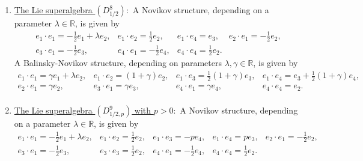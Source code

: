 \documentclass[12pt]{amsart}
\begin{document}
\begin{enumerate}
 \[
 \begin{array}{llll}
e_1\cdot e_1=-p e_1 +\lambda e_2, &  e_1\cdot e_2=(1-p) e_2, &  e_1\cdot e_4= (1-2p) e_4, & e_2\cdot e_1=- p e_2, \\[2mm] 
e_3\cdot e_1=-p e_3,& e_3 \cdot e_4=e_2, & e_4\cdot e_1=-p e_4.
\end{array}
 \]
A Balinsky-Novikov structure, depending on parameters $\lambda, \gamma \in \mathbb R$, is given by
 \[
 \begin{array}{llll}
e_1 \cdot e_1= (\gamma-1) e_1+\lambda e_2, & e_1\cdot e_2= \gamma e_2, & e_1\cdot e_3=\frac{1}{2}(2p+\gamma-1 )e_3, & e_1\cdot e_4= \frac{1}{2}(1-2p+\gamma)e_4,\\[2mm]
e_3\cdot e_1=(\gamma -1) e_3, & e_3\cdot e_4= e_2, & e_2\cdot e_1=(\gamma-1)e_2, &  e_4\cdot e_1=(\gamma-1) e_4\\[2mm]
 e_4\cdot e_3=e_2.
 \end{array}
 \]
   \item \underline{The Lie superalgebra $(D^{8}_{1/2}):$} A Novikov structure, depending on a parameter $\lambda\in \mathbb R$, is given by 
 \[
 \begin{array}{llll}
e_1\cdot e_1=-\frac{1}{2} e_1 +\lambda e_2, &  e_1\cdot e_2=\frac{1}{2} e_2, &  e_1\cdot e_4= e_3, & e_2\cdot e_1=- \frac{1}{2} e_2,\\[2mm]
 e_3\cdot e_1=- \frac{1}{2} e_3,& e_4 \cdot e_1= - \frac{1}{2}e_4, & e_4\cdot e_4=\frac{1}{2} e_2.
\end{array}
 \]
A Balinsky-Novikov structure, depending on parameters $\lambda, \gamma \in \mathbb R$, is given by
 \[
 \begin{array}{llll}
e_1 \cdot e_1= \gamma e_1+\lambda e_2, & e_1\cdot e_2= (1+\gamma) e_2, & e_1\cdot e_3=\frac{1}{2}(1+\gamma )e_3, & e_1\cdot e_4= e_3+\frac{1}{2}(1+\gamma)e_4,\\[2mm]
e_2\cdot e_1=\gamma e_2, & e_3\cdot e_1= \gamma e_3, & e_4\cdot e_1=\gamma e_4, &  e_4\cdot e_4= e_2.\\[2mm]
 \end{array}
 \]
    \item \underline{The Lie superalgebra $(D^{9}_{1/2,p})$ with $p>0:$} A Novikov structure, depending on a parameter  $\lambda\in \mathbb R$, is given by 
 \[
 \begin{array}{lllll}
e_1\cdot e_1=-\frac{1}{2} e_1 +\lambda e_2, &  e_1\cdot e_2=\frac{1}{2} e_2, &  e_1\cdot e_3= -p e_4, & e_1\cdot e_4= p e_3, & e_2\cdot e_1=- \frac{1}{2} e_2,\\[2mm]
e_3 \cdot e_1= - \frac{1}{2}e_3, &  e_3\cdot e_3=\frac{1}{2} e_2, & e_4\cdot e_1=-\frac{1}{2} e_4, & e_4\cdot e_4=\frac{1}{2} e_2.

\end{array}\]
\end{enumerate}
\end{document}
